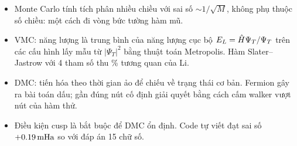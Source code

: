 \begin{ghinho}
\begin{itemize}
\item Monte Carlo tính tích phân nhiều chiều với sai số $\sim1/\sqrt M$, không phụ thuộc số chiều: một cách đi vòng bức tường hàm mũ.
\item VMC: năng lượng là trung bình của năng lượng cục bộ $E_L=\hat H\Psi_T/\Psi_T$ trên các cấu hình lấy mẫu từ $|\Psi_T|^2$ bằng thuật toán Metropolis. Hàm Slater--Jastrow với 4 tham số thu \PctVmc\% tương quan của Li.
\item DMC: tiến hóa theo thời gian ảo để chiếu về trạng thái cơ bản. Fermion gây ra bài toán dấu; gần đúng nút cố định giải quyết bằng cách cấm walker vượt nút của hàm thử.
\item Điều kiện cusp là bắt buộc để DMC ổn định. Code tự viết đạt sai số $+0.19\,\mathrm{mHa}$ so với đáp án 15 chữ số.
\end{itemize}
\end{ghinho}
